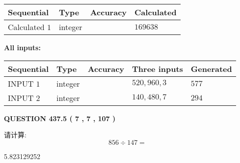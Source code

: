 \documentclass{ctexart}
\begin{document}
   
   
   
\noindent{}
   
   
  
  
\noindent\begin{tabular}{|l|l|l|l|}
\hline
 Sequential & Type & Accuracy & Calculated \\ 
\hline
 
 
  Calculated $  1 $ & integer &  & 
  $ 169638 $ 
 \\  \hline  
 \end{tabular}
   
   
   
   
\noindent\vspace{0.1in}\hspace{-0.08in} {\textbf{\Large{All inputs: }}}
   
   
  
  
\noindent\begin{tabular}{|l|l|l|l|l|}
\hline
 Sequential & Type & Accuracy & Three inputs & Generated \\ 
\hline
 
 
  INPUT $  1 $ & integer &  & $
 520
 , 
 960
 , 
 3
 $ & $ 577 $ 
 \\  \hline  
 
 
  INPUT $  2 $ & integer &  & $
 140
 , 
 480
 , 
 7
 $ & $ 294 $ 
 \\  \hline  
 \end{tabular}
   
   
  
\vspace{0.2in}
  
{\textbf{\Large{QUESTION
437.5 
 ( 7 , 7 , 107 )
}}}
  
  
 
请计算:
\begin{equation}
856  \div    %
147 = \nonumber
\end{equation}
 
 
 
\noindent{}
 
 

5.823129252
 
 
\noindent{}
 
 

 
 
 
\noindent{}
 
\end{document}
